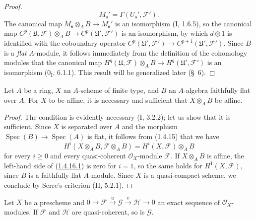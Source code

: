 \begin{proof}
\[M_{\mathbf s}'=\Gamma(U_{\mathbf s}',\mathcal F').
\]
The canonical map
$M_{\mathbf s}\otimes_A B\to M_{\mathbf s}'$ is an isomorphism
(I, 1.6.5), so the canonical map
$C^p(\mathfrak U,\mathcal F)\otimes_A B\to
C^p(\mathfrak U',\mathcal F')$ is an isomorphism, by which
$d\otimes1$ is identified with the coboundary operator
$C^p(\mathfrak U',\mathcal F')\to C^{p+1}(\mathfrak U',\mathcal F')$.
Since $B$ is a \emph{flat} $A$-module, it follows immediately from the
definition of the cohomology modules that the canonical map
$H^q(\mathfrak U,\mathcal F)\otimes_A B\to
H^q(\mathfrak U',\mathcal F')$ is an isomorphism
(0\textsubscript{I}, 6.1.1). This result will be generalized later (\S~6).
\end{proof}

\begin{corollary}[1.4.16]
\label{III.1.4.16}
Let $A$ be a ring, $X$ an $A$-scheme of finite type, and $B$ an $A$-algebra
faithfully flat over $A$. For $X$ to be affine, it is necessary and sufficient
that $X\otimes_A B$ be affine.
\end{corollary}

\begin{proof}
The condition is evidently necessary (I, 3.2.2); let us show that it is
sufficient. Since $X$ is separated over $A$ and the morphism
$\operatorname{Spec}(B)\to\operatorname{Spec}(A)$ is flat, it follows from
(1.4.15) that we have
\begin{equation}
\label{III.1.4.16.1}
\tag{1.4.16.1}
H^i(X\otimes_A B,\mathcal F\otimes_A B)
=H^i(X,\mathcal F)\otimes_A B
\end{equation}
for every $i\geq0$ and every quasi-coherent $\mathcal O_X$-module $\mathcal F$.
If $X\otimes_A B$ is affine, the left-hand side of
(\hyperref[III.1.4.16.1]{1.4.16.1}) is zero for $i=1$, so the same holds
for $H^1(X,\mathcal F)$, since $B$ is a faithfully flat $A$-module.
Since $X$ is a quasi-compact scheme, we conclude by Serre's criterion
(II, 5.2.1).
\end{proof}

\begin{proposition}[1.4.17]
\label{III.1.4.17}
Let $X$ be a prescheme and
$0\to\mathcal F\xrightarrow{u}\mathcal G\xrightarrow{v}\mathcal H\to0$
an exact sequence of $\mathcal O_X$-modules. If $\mathcal F$ and $\mathcal H$
are quasi-coherent, so is $\mathcal G$.
\end{proposition}

